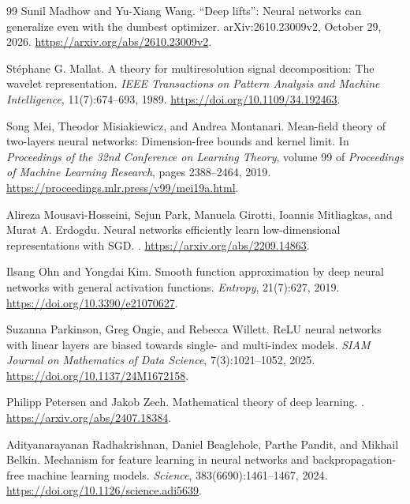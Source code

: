 \documentclass[11pt,twoside]{article}
\theoremstyle{definition}
\theoremstyle{remark}
\begin{document}
\begin{thebibliography}{99}
Sunil Madhow and Yu-Xiang Wang.
\newblock ``Deep lifts'': Neural networks can generalize even with the
dumbest optimizer.
\newblock arXiv:2610.23009v2, October 29, 2026.
\newblock \url{https://arxiv.org/abs/2610.23009v2}.

St\'ephane G. Mallat.
\newblock A theory for multiresolution signal decomposition: The wavelet
representation.
\newblock \emph{IEEE Transactions on Pattern Analysis and Machine
Intelligence}, 11(7):674--693, 1989.
\newblock \url{https://doi.org/10.1109/34.192463}.

Song Mei, Theodor Misiakiewicz, and Andrea Montanari.
\newblock Mean-field theory of two-layers neural networks: Dimension-free
bounds and kernel limit.
\newblock In \emph{Proceedings of the 32nd Conference on Learning Theory},
volume 99 of \emph{Proceedings of Machine Learning Research}, pages
2388--2464, 2019.
\newblock \url{https://proceedings.mlr.press/v99/mei19a.html}.

Alireza Mousavi-Hosseini, Sejun Park, Manuela Girotti, Ioannis Mitliagkas,
and Murat A. Erdogdu.
\newblock Neural networks efficiently learn low-dimensional representations
with SGD.
.
\newblock \url{https://arxiv.org/abs/2209.14863}.

Ilsang Ohn and Yongdai Kim.
\newblock Smooth function approximation by deep neural networks with general
activation functions.
\newblock \emph{Entropy}, 21(7):627, 2019.
\newblock \url{https://doi.org/10.3390/e21070627}.

Suzanna Parkinson, Greg Ongie, and Rebecca Willett.
\newblock ReLU neural networks with linear layers are biased towards single-
and multi-index models.
\newblock \emph{SIAM Journal on Mathematics of Data Science}, 7(3):1021--1052,
2025.
\newblock \url{https://doi.org/10.1137/24M1672158}.

Philipp Petersen and Jakob Zech.
\newblock Mathematical theory of deep learning.
.
\newblock \url{https://arxiv.org/abs/2407.18384}.

Adityanarayanan Radhakrishnan, Daniel Beaglehole, Parthe Pandit, and
Mikhail Belkin.
\newblock Mechanism for feature learning in neural networks and
backpropagation-free machine learning models.
\newblock \emph{Science}, 383(6690):1461--1467, 2024.
\newblock \url{https://doi.org/10.1126/science.adi5639}.


\end{thebibliography}
\end{document}
